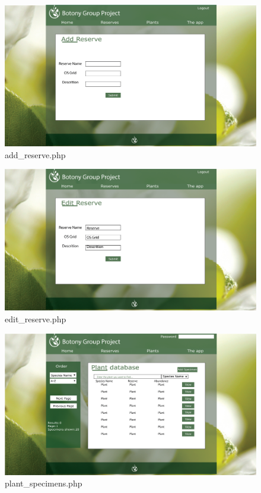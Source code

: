 \begin{landscape}
            \begin{figure}
                \centering
                \includegraphics[scale=0.4]{uiDesign/uiwebimages/addreserve.png}
                \caption{add\_reserve.php}
                \label{fig:addReserve}
            \end{figure}


            \begin{figure}
                \centering
                \includegraphics[scale=0.4]{uiDesign/uiwebimages/editreserve.png}
                \caption{edit\_reserve.php}
                \label{fig:editReserve}
            \end{figure}


            \begin{figure}
                \centering
                \includegraphics[scale=0.4]{uiDesign/uiwebimages/plantdb.png}
                \caption{plant\_specimens.php}
                \label{fig:plantdb}
            \end{figure}



\end{landscape}
